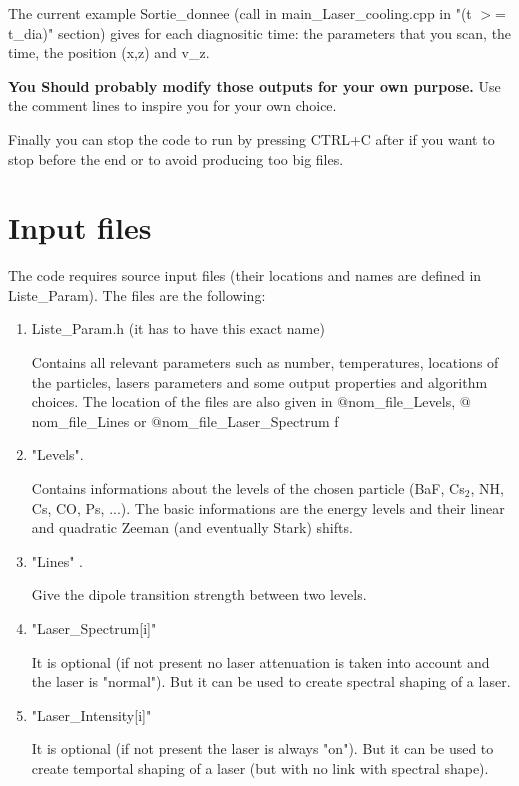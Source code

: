 \documentclass[amsmath,amssymb,nofootinbib]{revtex4-2}
\begin{document}
The current example  Sortie\_donnee (call in main\_Laser\_cooling.cpp  in "(t $>$= t\_dia)" section)
gives for each diagnositic time: the parameters that you scan, the time, the position (x,z) and v\_z.

{\bf You Should probably modify those outputs for your own purpose.}
Use the comment lines to inspire you for your own choice.


Finally you can stop the code to run by pressing CTRL+C after if you want to stop before the end or to avoid producing too big files.

\section{Input files}


The code requires source input files 
(their locations and names are defined in Liste\_Param). The files are the following:

\begin{enumerate}
\item Liste\_Param.h (it has to have this exact name)

Contains all relevant parameters such as number, temperatures, locations of the particles, lasers parameters and some output properties and algorithm choices.
The location of the files are also given in $@${}nom\_file\_Levels,   
$@${}nom\_file\_Lines    or $@${}nom\_file\_Laser\_Spectrum  
f


	\item "Levels".
	
	Contains informations about the levels of the chosen particle (BaF, Cs$_2$, NH, Cs, CO, Ps, ...). The basic informations are the energy levels and their linear and quadratic Zeeman (and eventually Stark) shifts.
	
	\item "Lines" .
	
	Give the dipole transition strength between two levels.
	
	\item "Laser\_Spectrum[i]"
	 
	It is optional (if not present no laser attenuation is taken into account and the laser is "normal"). But it can be used to create spectral shaping of a laser.
	
		\item "Laser\_Intensity[i]"
	
	It is optional (if not present the laser is always "on"). But it can be used to create temportal shaping of a laser (but with no link with spectral shape).

 
\end{enumerate}
\end{document}
